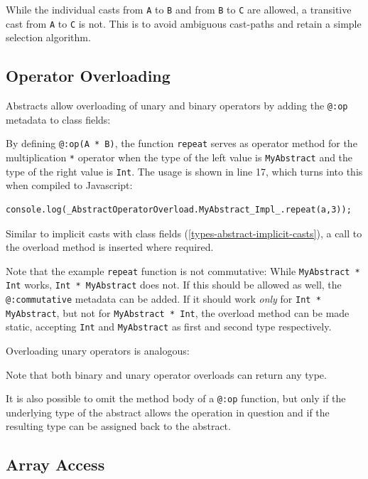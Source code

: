 \documentclass[a4paper,oneside]{book}
\newcommand{\target}[1]{#1}
\newcommand{\type}[1]{\texttt{#1}}
\newcommand{\expr}[1]{\texttt{#1}}
\newcommand{\tref}[2]{#1 (\ref{#2})}
\newcommand{\haxe}[2][]{%
}
\begin{document}
\haxe{assets/ImplicitTransitiveCast.hx}
While the individual casts from \type{A} to \type{B} and from \type{B} to \type{C} are allowed, a transitive cast from \type{A} to \type{C} is not. This is to avoid ambiguous cast-paths and retain a simple selection algorithm. 




\subsection{Operator Overloading}
\label{types-abstract-operator-overloading}

Abstracts allow overloading of unary and binary operators by adding the \expr{@:op} metadata to class fields:

\haxe{assets/AbstractOperatorOverload.hx}
By defining \expr{@:op(A * B)}, the function \expr{repeat} serves as operator method for the multiplication \expr{*} operator when the type of the left value is \type{MyAbstract} and the type of the right value is \type{Int}. The usage is shown in line 17, which turns into this when compiled to \target{Javascript}:

\begin{lstlisting}
console.log(_AbstractOperatorOverload.MyAbstract_Impl_.repeat(a,3));
\end{lstlisting}
Similar to \tref{implicit casts with class fields}{types-abstract-implicit-casts}, a call to the overload method is inserted where required.

Note that the example \expr{repeat} function is not commutative: While \expr{MyAbstract * Int} works, \expr{Int * MyAbstract} does not. If this should be allowed as well, the \expr{@:commutative} metadata can be added. If it should work \emph{only} for \expr{Int * MyAbstract}, but not for \expr{MyAbstract * Int}, the overload method can be made static, accepting \type{Int} and \type{MyAbstract} as first and second type respectively.

Overloading unary operators is analogous:

\haxe{assets/AbstractUnopOverload.hx}
Note that both binary and unary operator overloads can return any type.

It is also possible to omit the method body of a \expr{@:op} function, but only if the underlying type of the abstract allows the operation in question and if the resulting type can be assigned back to the abstract.


\subsection{Array Access}
\label{types-abstract-array-access}
\end{document}
